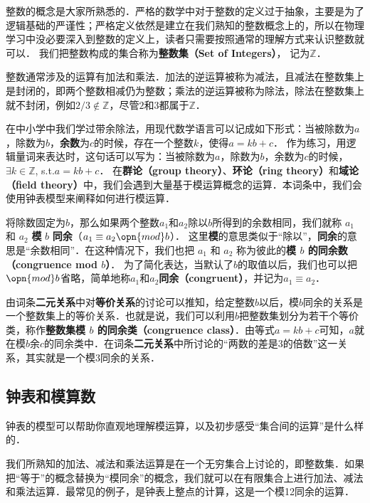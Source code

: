 

整数的概念是大家所熟悉的．严格的数学中对于整数的定义过于抽象，主要是为了逻辑基础的严谨性；严格定义依然是建立在我们熟知的整数概念上的，所以在物理学习中没必要深入到整数的定义上，读者只需要按照通常的理解方式来认识整数就可以． 我们把整数构成的集合称为\textbf{整数集（Set of Integers）}， 记为$\mathbb{Z}$．

整数通常涉及的运算有加法和乘法．加法的逆运算被称为减法，且减法在整数集上是封闭的，即两个整数相减仍为整数；乘法的逆运算被称为除法，除法在整数集上就不封闭，例如$2/3\not\in\mathbb{Z}$，尽管$2$和$3$都属于$\mathbb{Z}$．

在中小学中我们学过带余除法，用现代数学语言可以记成如下形式：当被除数为$a$，除数为$b$，\textbf{余数}为$c$的时候，存在一个整数$k$，使得$a=kb+c$． 作为练习，用逻辑量词来表达时，这句话可以写为：当被除数为$a$，除数为$b$，余数为$c$的时候，$\exists k\in \mathbb{Z}$, s.t.$ a=kb+c$． 在\textbf{群论（group theory）}、\textbf{环论（ring theory）}和\textbf{域论（field theory）}中，我们会遇到大量基于模运算概念的运算．本词条中，我们会使用钟表模型来阐释如何进行模运算．

将除数固定为$b$，那么如果两个整数$a_1$和$a_2$除以$b$所得到的余数相同，我们就称 $a_1$ 和 $a_2$ \textbf{模} $b$ \textbf{同余}（$a_1\equiv a_2 \opn{mod} b$）． 这里\textbf{模}的意思类似于“除以”，\textbf{同余}的意思是“余数相同”．在这种情况下，我们也把 $a_1$ 和 $a_2$ 称为彼此的\textbf{模 $b$ 的同余数（congruence mod $b$）}． 为了简化表达，当默认了$b$的取值以后，我们也可以把 $\opn{mod} b$省略，简单地称$a_1$和$a_2$\textbf{同余（congruent）}，并记为$a_1\equiv a_2$． 

由词条\textbf{二元关系}中对\textbf{等价关系}的讨论可以推知，给定整数$b$以后，模$b$同余的关系是一个整数集上的等价关系．也就是说，我们可以利用$b$把整数集划分为若干个等价类，称作\textbf{整数集模 $b$ 的同余类（congruence class）}．由等式$a=kb+c$可知，$a$就在模$b$余$c$的同余类中．在词条\textbf{二元关系}中所讨论的“两数的差是3的倍数”这一关系，其实就是一个模3同余的关系．

\subsection{钟表和模算数}

钟表的模型可以帮助你直观地理解模运算，以及初步感受“集合间的运算”是什么样的．

我们所熟知的加法、减法和乘法运算是在一个无穷集合上讨论的，即整数集．如果把“等于”的概念替换为“模同余”的概念，我们就可以在有限集合上进行加法、减法和乘法运算．最常见的例子，是钟表上整点的计算，这是一个模12同余的运算．

